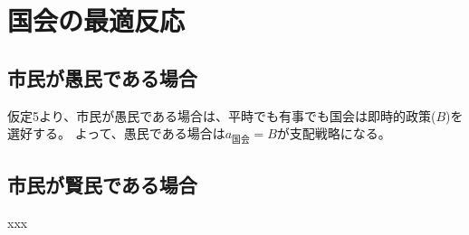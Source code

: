 \documentclass[main.tex]{subfiles}
\begin{document}
\section{国会の最適反応}


\subsection{市民が愚民である場合}

仮定5より、市民が愚民である場合は、平時でも有事でも国会は即時的政策($B$)を選好する。
よって、愚民である場合は$a_{国会}=B$が支配戦略になる。


\subsection{市民が賢民である場合}

xxx
\end{document}
